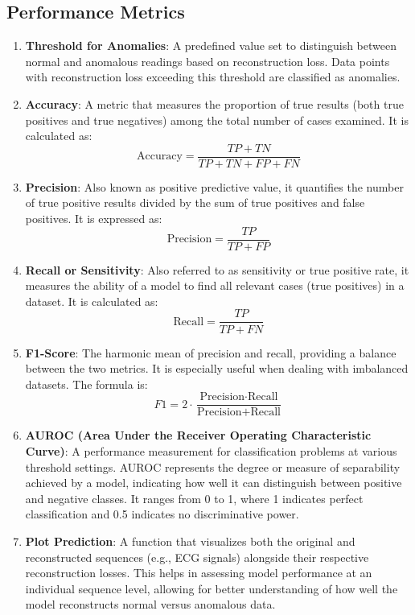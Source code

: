 \documentclass[nonacm,sigconf]{acmart}
\begin{document}
\subsection{Performance Metrics}
\begin{enumerate}
    \item \textbf{Threshold for Anomalies}: A predefined value set to distinguish between normal and anomalous readings based on reconstruction loss. Data points with reconstruction loss exceeding this threshold are classified as anomalies.

\item \textbf{Accuracy}: A metric that measures the proportion of true results (both true positives and true negatives) among the total number of cases examined. It is calculated as:
$$
\text{Accuracy} = \frac{TP + TN}{TP + TN + FP + FN}
$$

\item \textbf{Precision}: Also known as positive predictive value, it quantifies the number of true positive results divided by the sum of true positives and false positives. It is expressed as:
$$
\text{Precision} = \frac{TP}{TP + FP}
$$

\item \textbf{Recall or Sensitivity}: Also referred to as sensitivity or true positive rate, it measures the ability of a model to find all relevant cases (true positives) in a dataset. It is calculated as:
$$
\text{Recall} = \frac{TP}{TP + FN}
$$

\item \textbf{F1-Score}: The harmonic mean of precision and recall, providing a balance between the two metrics. It is especially useful when dealing with imbalanced datasets. The formula is:
$$
F1 = 2 \cdot \frac{\text{Precision} \cdot \text{Recall}}{\text{Precision} + \text{Recall}}
$$
\item \textbf{AUROC (Area Under the Receiver Operating Characteristic Curve)}: A performance measurement for classification problems at various threshold settings. AUROC represents the degree or measure of separability achieved by a model, indicating how well it can distinguish between positive and negative classes. It ranges from 0 to 1, where 1 indicates perfect classification and 0.5 indicates no discriminative power.
\item \textbf{Plot Prediction}: A function that visualizes both the original and reconstructed sequences (e.g., ECG signals) alongside their respective reconstruction losses. This helps in assessing model performance at an individual sequence level, allowing for better understanding of how well the model reconstructs normal versus anomalous data.

\end{enumerate}
\end{document}
